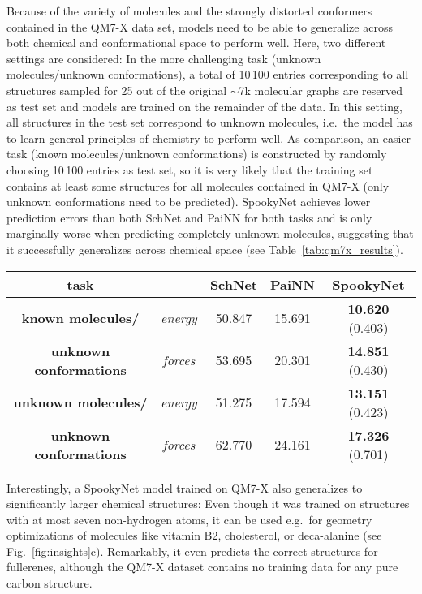 \documentclass[%
superscriptaddress,
reprint,
nofootinbib,
amsmath,amssymb,amsfonts,
floatfix,
altaffilletter,
showkeys,
]{revtex4-2}
\newcommand{\nn}{SpookyNet}
\begin{document}
Because of the variety of molecules and the strongly distorted conformers contained in the QM7-X data set, models need to be able to generalize across both chemical and conformational space to perform well. Here, two different settings are considered: In the more challenging task (unknown molecules/unknown conformations), a total of 10\,100 entries corresponding to all structures sampled for 25 out of the original $\sim$7k molecular graphs are reserved as test set and models are trained on the remainder of the data. In this setting, all structures in the test set correspond to unknown molecules, i.e.\ the model has to learn general principles of chemistry to perform well. %
As comparison, an easier task (known molecules/unknown conformations) is constructed by randomly choosing 10\,100 entries as test set, so it is very likely that the training set contains at least some structures for all molecules contained in QM7-X (only unknown conformations need to be predicted).  \nn{} achieves lower prediction errors than both SchNet\cite{schutt2018schnet} and PaiNN\cite{schutt2021equivariant} for both tasks and is only marginally worse when predicting completely unknown molecules, suggesting that it successfully generalizes across chemical space (see Table~\ref{tab:qm7x_results}).
\begin{table*}
	\begin{tabular}{c c c c  c}
		\toprule
		task & &
		\textbf{SchNet}\cite{schutt2018schnet} & \textbf{PaiNN}\cite{schutt2021equivariant} &
		\textbf{\nn{}} \\
		\midrule
		\textbf{known molecules/} &  \textit{energy} & 50.847 & 15.691 & \textbf{10.620} (0.403) \\
		\textbf{unknown conformations} &  \textit{forces} & 53.695 & 20.301 & \textbf{14.851} (0.430) \\
		\midrule
		\textbf{unknown molecules/} &  \textit{energy} & 51.275 & 17.594 & \textbf{13.151} (0.423)  \\
		\textbf{unknown conformations} & \textit{forces} & 62.770  & 24.161 & \textbf{17.326} (0.701) \\
		\bottomrule
	\end{tabular}
	\caption{Mean absolute errors for energy (meV) and force (meV~\AA$^{-1}$) predictions for the QM7-X\cite{hoja2021qm7} dataset. Results for \nn{} are averaged over four runs, the standard deviation between runs is given in brackets. Best results in bold.}
	\label{tab:qm7x_results}
\end{table*}
Interestingly, a \nn{} model trained on QM7-X also generalizes to significantly larger chemical structures: Even though it was trained on structures with at most seven non-hydrogen atoms, it can be used e.g.\ for geometry optimizations of molecules like vitamin B2, cholesterol, or deca-alanine (see Fig.~\ref{fig:insights}c). Remarkably, it even predicts the correct structures for fullerenes, although the QM7-X dataset contains no training data for any pure carbon structure.
\end{document}
